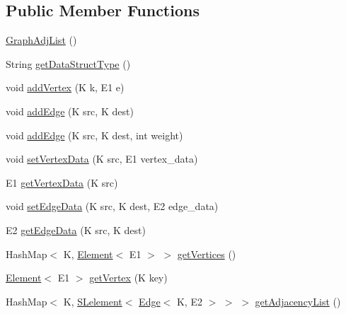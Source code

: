 \subsection*{Public Member Functions}
\begin{DoxyCompactItemize}
\item 
\hyperlink{classbridges_1_1base_1_1_graph_adj_list_aba7e066f43d361418ae6bdf53a23b1de}{Graph\+Adj\+List} ()
\item 
String \hyperlink{classbridges_1_1base_1_1_graph_adj_list_a40c4a2faf20c9847e8ba0d8024236a4b}{get\+Data\+Struct\+Type} ()
\item 
void \hyperlink{classbridges_1_1base_1_1_graph_adj_list_aca59a3c40af4ae82716ebbfa1751f267}{add\+Vertex} (K k, E1 e)
\item 
void \hyperlink{classbridges_1_1base_1_1_graph_adj_list_a43041976184920e1db1dbe3ad696c6cd}{add\+Edge} (K src, K dest)
\item 
void \hyperlink{classbridges_1_1base_1_1_graph_adj_list_ab871e88553047930648c2c1ac1a9797e}{add\+Edge} (K src, K dest, int weight)
\item 
void \hyperlink{classbridges_1_1base_1_1_graph_adj_list_aa80bfbbe9c4dd130632db1e1165d635e}{set\+Vertex\+Data} (K src, E1 vertex\+\_\+data)
\item 
E1 \hyperlink{classbridges_1_1base_1_1_graph_adj_list_a3d5f73795bcd5011c425eaca33383454}{get\+Vertex\+Data} (K src)
\item 
void \hyperlink{classbridges_1_1base_1_1_graph_adj_list_a48041b13b10d5fb677f48a0debfc268e}{set\+Edge\+Data} (K src, K dest, E2 edge\+\_\+data)
\item 
E2 \hyperlink{classbridges_1_1base_1_1_graph_adj_list_a13cdc7ed89fb211f47e2b04da0b65561}{get\+Edge\+Data} (K src, K dest)
\item 
Hash\+Map$<$ K, \hyperlink{classbridges_1_1base_1_1_element}{Element}$<$ E1 $>$ $>$ \hyperlink{classbridges_1_1base_1_1_graph_adj_list_acd53b2393db0936ad5812997f67ee1ee}{get\+Vertices} ()
\item 
\hyperlink{classbridges_1_1base_1_1_element}{Element}$<$ E1 $>$ \hyperlink{classbridges_1_1base_1_1_graph_adj_list_aa19cd300a85b05352bdf58720310a112}{get\+Vertex} (K key)
\item 
Hash\+Map$<$ K, \hyperlink{classbridges_1_1base_1_1_s_lelement}{S\+Lelement}$<$ \hyperlink{classbridges_1_1base_1_1_edge}{Edge}$<$ K, E2 $>$ $>$ $>$ \hyperlink{classbridges_1_1base_1_1_graph_adj_list_a77771e356aa8bf44525be9ae01603989}{get\+Adjacency\+List} ()
\item 

\end{DoxyCompactItemize}
